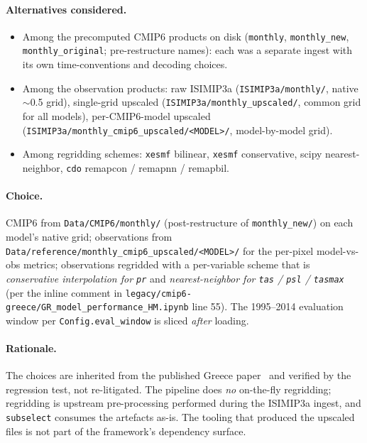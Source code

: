 \documentclass[11pt,a4paper]{article}
\begin{document}
\paragraph{Alternatives considered.}
\begin{itemize}
  \item Among the precomputed CMIP6 products on disk (\texttt{monthly},
        \texttt{monthly\_new}, \texttt{monthly\_original}; pre-restructure
        names): each was a separate ingest with its own time-conventions and
        decoding choices.
  \item Among the observation products: raw ISIMIP3a
        (\texttt{ISIMIP3a/monthly/}, native $\sim$0.5\textdegree{} grid),
        single-grid upscaled (\texttt{ISIMIP3a/monthly\_upscaled/}, common
        grid for all models), per-CMIP6-model upscaled
        (\texttt{ISIMIP3a/monthly\_cmip6\_upscaled/<MODEL>/}, model-by-model
        grid).
  \item Among regridding schemes: \texttt{xesmf} bilinear, \texttt{xesmf}
        conservative, scipy nearest-neighbor, \texttt{cdo} remapcon /
        remapnn / remapbil.
\end{itemize}

\paragraph{Choice.} CMIP6 from \texttt{Data/CMIP6/monthly/} (post-restructure
of \texttt{monthly\_new/}) on each model's native grid; observations from
\texttt{Data/reference/monthly\_cmip6\_upscaled/<MODEL>/} for the per-pixel
model-vs-obs metrics; observations regridded with a per-variable scheme
that is \emph{conservative interpolation for \texttt{pr}} and
\emph{nearest-neighbor for \texttt{tas} / \texttt{psl} / \texttt{tasmax}}
(per the inline comment in \texttt{legacy/cmip6-greece/GR\_model\_performance\_HM.ipynb}
line 55). The 1995--2014 evaluation window per \texttt{Config.eval\_window}
is sliced \emph{after} loading.

\paragraph{Rationale.} The choices are inherited from the published Greece
paper~\citep{tsilimigkras2026subselection} and verified by the regression
test, not re-litigated. The pipeline does \emph{no} on-the-fly regridding;
regridding is upstream pre-processing performed during the ISIMIP3a
ingest, and \texttt{subselect} consumes the artefacts as-is. The tooling
that produced the upscaled files is not part of the framework's
dependency surface.
\end{document}
